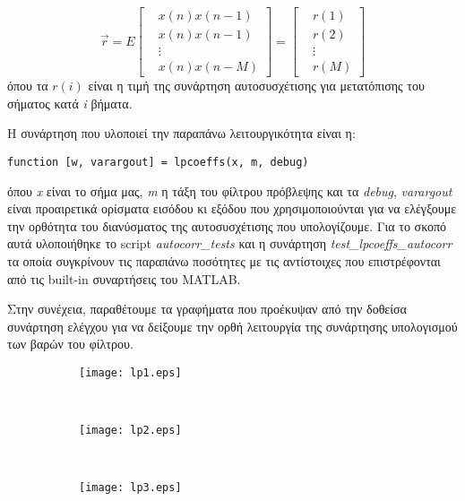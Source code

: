 \begin{equation}
  \label{eq:autocorr_vec}
  \vec{r} = E\begin{bmatrix}
    &x(n)x(n-1) \\
    &x(n)x(n-1) \\
    &\vdots \\
    &x(n)x(n-M)
  \end{bmatrix} = \begin{bmatrix}
    &r(1) \\
    &r(2) \\
    &\vdots \\
    &r(M)
  \end{bmatrix}
\end{equation}
\noindent όπου τα $r(i)$ είναι η τιμή της συνάρτηση αυτοσυσχέτισης για μετατόπισης του σήματος κατά \emph{i}
βήματα.

\par Η συνάρτηση που υλοποιεί την παραπάνω λειτουργικότητα είναι η:
\begin{lstlisting}[style=MyMatlab]
 function [w, varargout] = lpcoeffs(x, m, debug)
\end{lstlisting}
\par όπου \emph{x} είναι το σήμα μας, \emph{m} η τάξη του φίλτρου πρόβλεψης και τα \emph{debug},
\emph{varargout} είναι προαιρετικά ορίσματα εισόδου κι εξόδου που χρησιμοποιούνται για να ελέγξουμε την ορθότητα
του διανύσματος της αυτοσυσχέτισης που υπολογίζουμε. Για το σκοπό αυτά υλοποιήθηκε το script
\emph{autocorr\_tests} και η συνάρτηση \emph{test\_lpcoeffs\_autocorr} τα οποία συγκρίνουν τις παραπάνω
ποσότητες με τις αντίστοιχες που επιστρέφονται από τις built-in συναρτήσεις του MATLAB.


\noindent
\begin{minipage}{\linewidth}
  \par Στην συνέχεια, παραθέτουμε τα γραφήματα που προέκυψαν από την δοθείσα συνάρτηση ελέγχου για
  να δείξουμε την ορθή λειτουργία της συνάρτησης υπολογισμού των βαρών του φίλτρου.
  \begin{figure}[H]
    \label{fig:pred_filter1}
    \centering
    \begin{subfigure}{0.49\textwidth}
      \texttt{[image: lp1.eps]}
      \caption{}
    \end{subfigure}
    \,
    \begin{subfigure}{0.49\textwidth}
      \texttt{[image: lp2.eps]}
      \caption{}
    \end{subfigure}
    \\
    \begin{subfigure}{0.49\textwidth}
      \texttt{[image: lp3.eps]}
      \caption{}
    \end{subfigure}
    \caption{}
  \end{figure}
\end{minipage}

